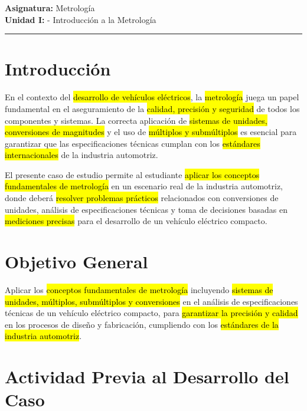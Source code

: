 \documentclass{article}
\begin{document}
%

\textbf{Asignatura:} Metrología \\
\textbf{Unidad I:} - Introducción a la Metrología 

\vspace{5mm}
\hrule
\vspace{5mm}


\section*{Introducción}

En el contexto del \hl{desarrollo de vehículos eléctricos}, la \hl{metrología} juega un papel fundamental en el aseguramiento de la \hl{calidad, precisión y seguridad} de todos los componentes y sistemas. La correcta aplicación de \hl{sistemas de unidades, conversiones de magnitudes} y el uso de \hl{múltiplos y submúltiplos} es esencial para garantizar que las especificaciones técnicas cumplan con los \hl{estándares internacionales} de la industria automotriz.

El presente caso de estudio permite al estudiante \hl{aplicar los conceptos fundamentales de metrología} en un escenario real de la industria automotriz, donde deberá \hl{resolver problemas prácticos} relacionados con conversiones de unidades, análisis de especificaciones técnicas y toma de decisiones basadas en \hl{mediciones precisas} para el desarrollo de un vehículo eléctrico compacto.

\section*{Objetivo General}

Aplicar los \hl{conceptos fundamentales de metrología} incluyendo \hl{sistemas de unidades, múltiplos, submúltiplos y conversiones} en el análisis de especificaciones técnicas de un vehículo eléctrico compacto, para \hl{garantizar la precisión y calidad} en los procesos de diseño y fabricación, cumpliendo con los \hl{estándares de la industria automotriz}.

\section*{Actividad Previa al Desarrollo del Caso}
\end{document}
